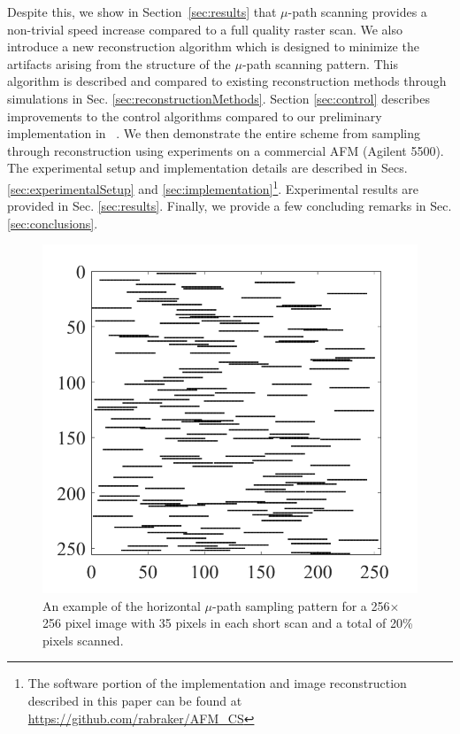 \documentclass[twocolumn,oneside]{IEEEtran/IEEEtran}
\begin{document}
Despite this, we show in Section~\ref{sec:results} that $\mu$-path scanning provides a non-trivial speed increase compared to a full quality raster scan. 
We also introduce a new reconstruction algorithm which is designed to
minimize the artifacts arising from the structure of the $\mu$-path
scanning pattern. This algorithm is described and compared to existing
reconstruction methods through simulations in Sec.
\ref{sec:reconstructionMethods}. Section \ref{sec:control} describes
improvements to the control algorithms compared to our preliminary
implementation in ~\cite{braker_hardware_2018}. We then demonstrate
the entire scheme from sampling through reconstruction using
experiments on a commercial AFM (Agilent 5500). The experimental setup
and implementation details are described in Secs.
\ref{sec:experimentalSetup} and \ref{sec:implementation}\footnote{The
  software portion of the implementation and image reconstruction
  described in this paper can be found at
  \url{https://github.com/rabraker/AFM_CS}}. Experimental results are
provided in Sec. \ref{sec:results}. Finally, we provide a few
concluding remarks in Sec. \ref{sec:conclusions}.

\begin{figure}
  \centering
  \includegraphics[width=0.7\columnwidth]{figures-SBA/random_mask.pdf}
  \caption{An example of the horizontal $\mu$-path sampling pattern
    for a 256$\times$256 pixel image with 35 pixels in each short scan
    and a total of 20\% pixels scanned.}
  \label{fig:mu_mask}
\end{figure}
\end{document}
